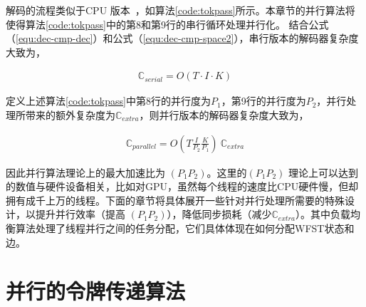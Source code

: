 解码的流程类似于CPU 版本~\cite{povey2011kaldi}，如算法\ref{code:tokpass}所示。本章节的并行算法将使得算法\ref{code:tokpass}中的第8和第9行的串行循环处理并行化。
结合公式（\ref{equ:dec-cmp-dec}）和公式（\ref{equ:dec-cmp-space2}），串行版本的解码器复杂度大致为，

\begin{equation}
\label{equ:dec-cmp-serial}
 \begin{split}
\mathbb{C}_{serial} = O(T\cdot I\cdot  K)
 \end{split}
\end{equation}

定义上述算法\ref{code:tokpass}中第8行的并行度为$P_1$，第9行的并行度为$P_2$，并行处理所带来的额外复杂度为$\mathbb{C}_{extra} $，则并行版本的解码器复杂度大致为，

\begin{equation}
\label{equ:dec-cmp-parallel}
 \begin{split}
\mathbb{C}_{parallel} = O(T \frac{I}{P_2}  \frac{K}{P_1})\ \mathbb{C}_{extra}
 \end{split}
\end{equation}

因此并行算法理论上的最大加速比为 $(P_1  P_2)$。这里的$(P_1  P_2)$ 理论上可以达到的数值与硬件设备相关，比如对GPU，虽然每个线程的速度比CPU硬件慢，但却拥有成千上万的线程。下面的章节将具体展开一些针对并行处理所需要的特殊设计，以提升并行效率（提高 $(P_1  P_2)$），降低同步损耗（减少$\mathbb{C}_{extra}$）。其中负载均衡算法处理了线程并行之间的任务分配，它们具体体现在如何分配WFST状态和边。

\section{并行的令牌传递算法}
\label{sec:atomic}

